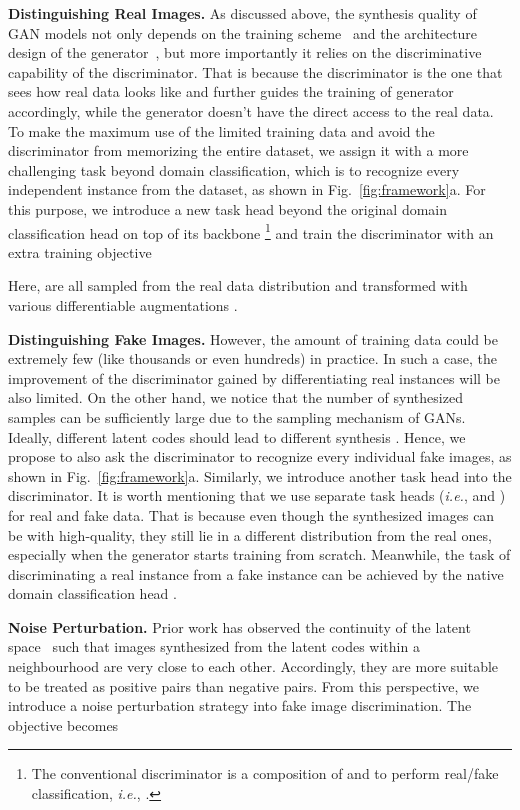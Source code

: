\documentclass{article}
\begin{document}
\textbf{Distinguishing Real Images.}
As discussed above, the synthesis quality of GAN models not only depends on the training scheme~\cite{arjovsky2017wasserstein, miyato2018spectral, karras2017progressive, brock2018large} and the architecture design of the generator~\cite{zhang2019self, karras2019style, Karras2019stylegan2}, but more importantly it relies on the discriminative capability of the discriminator.
That is because the discriminator is the one that sees how real data looks like and further guides the training of generator accordingly, while the generator doesn't have the direct access to the real data.
To make the maximum use of the limited training data and avoid the discriminator from memorizing the entire dataset, we assign it with a more challenging task beyond domain classification, which is to recognize every independent instance from the dataset, as shown in Fig.~\ref{fig:framework}a.
For this purpose, we introduce a new task head  beyond the original domain classification head  on top of its backbone \footnote{The conventional discriminator is a composition of  and  to perform real/fake classification, \textit{i.e.}, .}
and train the discriminator with an extra training objective

Here,  are all sampled from the real data distribution  and transformed with various differentiable augmentations .


\textbf{Distinguishing Fake Images.}
However, the amount of training data could be extremely few (like thousands or even hundreds) in practice.
In such a case, the improvement of the discriminator gained by differentiating real instances will be also limited.
On the other hand, we notice that the number of synthesized samples can be sufficiently large due to the sampling mechanism of GANs.
Ideally, different latent codes  should lead to different synthesis .
Hence, we propose to also ask the discriminator to recognize every individual fake images, as shown in Fig.~\ref{fig:framework}a.
Similarly, we introduce another task head  into the discriminator.
It is worth mentioning that we use separate task heads (\textit{i.e.},  and ) for real and fake data.
That is because even though the synthesized images can be with high-quality, they still lie in a different distribution from the real ones, especially when the generator starts training from scratch.
Meanwhile, the task of discriminating a real instance from a fake instance can be achieved by the native domain classification head .


\textbf{Noise Perturbation.}
Prior work has observed the continuity of the latent space~\cite{radford2015unsupervised} such that images synthesized from the latent codes within a neighbourhood are very close to each other.
Accordingly, they are more suitable to be treated as positive pairs than negative pairs.
From this perspective, we introduce a noise perturbation strategy into fake image discrimination.
The objective becomes
\end{document}
